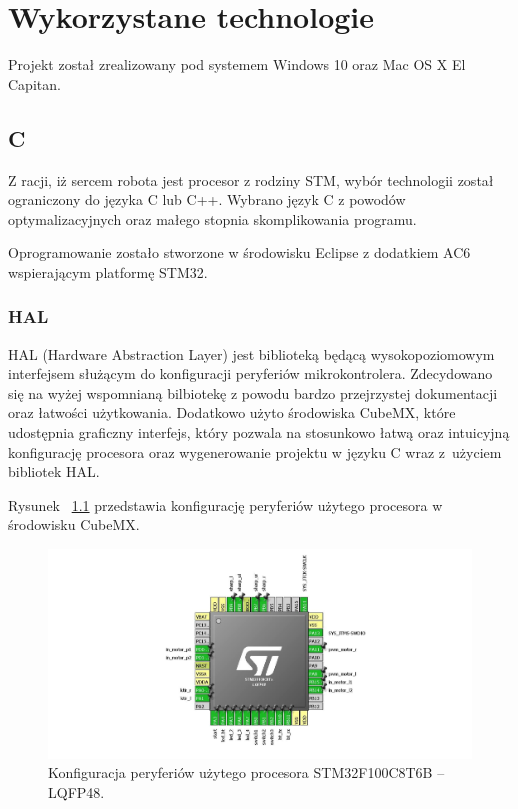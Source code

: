 \chapter{Wykorzystane technologie}

Projekt został zrealizowany pod systemem Windows 10 oraz Mac OS X El Capitan. 

\section{C}
Z racji, iż sercem robota jest procesor z rodziny STM, wybór technologii został ograniczony do języka C lub C++. Wybrano język C z powodów optymalizacyjnych oraz małego stopnia skomplikowania programu. 


Oprogramowanie zostało stworzone w środowisku Eclipse z dodatkiem AC6 wspierającym platformę STM32.

\subsection{HAL}
HAL (Hardware Abstraction Layer) jest biblioteką będącą wysokopoziomowym interfejsem służącym do konfiguracji peryferiów mikrokontrolera. Zdecydowano się na wyżej wspomnianą bilbiotekę z powodu bardzo przejrzystej dokumentacji oraz łatwości użytkowania. Dodatkowo użyto środowiska CubeMX, które udostępnia graficzny interfejs, który pozwala na stosunkowo łatwą oraz intuicyjną konfigurację procesora oraz wygenerowanie projektu w języku C wraz z~użyciem bibliotek HAL.

Rysunek ~\ref{fig:cubemx} przedstawia konfigurację peryferiów użytego procesora w środowisku CubeMX.   

\begin{figure}[H]
	\centering
		\includegraphics[width=0.85\linewidth]{pic02/cubemx}
	\caption{Konfiguracja peryferiów użytego procesora STM32F100C8T6B – LQFP48.}
	\label{fig:cubemx}	
\end{figure}

